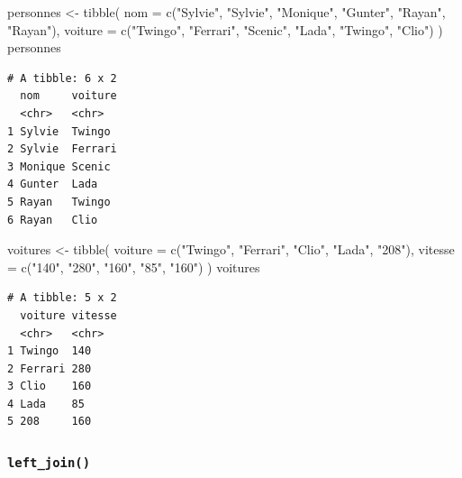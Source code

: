 \documentclass[
  letterpaper,
  DIV=11,
  numbers=noendperiod,
  oneside]{scrreprt}
\newenvironment{Shaded}{\begin{snugshade}}{\end{snugshade}}
\newcommand{\AttributeTok}[1]{\textcolor[rgb]{0.40,0.45,0.13}{#1}}
\newcommand{\FunctionTok}[1]{\textcolor[rgb]{0.28,0.35,0.67}{#1}}
\newcommand{\NormalTok}[1]{\textcolor[rgb]{0.00,0.23,0.31}{#1}}
\newcommand{\OtherTok}[1]{\textcolor[rgb]{0.00,0.23,0.31}{#1}}
\newcommand{\StringTok}[1]{\textcolor[rgb]{0.13,0.47,0.30}{#1}}
\begin{document}
\begin{Shaded}
\begin{Highlighting}[]
\NormalTok{personnes }\OtherTok{\textless{}{-}} \FunctionTok{tibble}\NormalTok{(}
  \AttributeTok{nom =} \FunctionTok{c}\NormalTok{(}\StringTok{"Sylvie"}\NormalTok{, }\StringTok{"Sylvie"}\NormalTok{, }\StringTok{"Monique"}\NormalTok{, }\StringTok{"Gunter"}\NormalTok{, }\StringTok{"Rayan"}\NormalTok{, }\StringTok{"Rayan"}\NormalTok{),}
  \AttributeTok{voiture =} \FunctionTok{c}\NormalTok{(}\StringTok{"Twingo"}\NormalTok{, }\StringTok{"Ferrari"}\NormalTok{, }\StringTok{"Scenic"}\NormalTok{, }\StringTok{"Lada"}\NormalTok{, }\StringTok{"Twingo"}\NormalTok{, }\StringTok{"Clio"}\NormalTok{)}
\NormalTok{)}
\NormalTok{personnes}
\end{Highlighting}
\end{Shaded}

\begin{verbatim}
# A tibble: 6 x 2
  nom     voiture
  <chr>   <chr>  
1 Sylvie  Twingo 
2 Sylvie  Ferrari
3 Monique Scenic 
4 Gunter  Lada   
5 Rayan   Twingo 
6 Rayan   Clio   
\end{verbatim}

\begin{Shaded}
\begin{Highlighting}[]
\NormalTok{voitures }\OtherTok{\textless{}{-}} \FunctionTok{tibble}\NormalTok{(}
  \AttributeTok{voiture =} \FunctionTok{c}\NormalTok{(}\StringTok{"Twingo"}\NormalTok{, }\StringTok{"Ferrari"}\NormalTok{, }\StringTok{"Clio"}\NormalTok{, }\StringTok{"Lada"}\NormalTok{, }\StringTok{"208"}\NormalTok{),}
  \AttributeTok{vitesse =} \FunctionTok{c}\NormalTok{(}\StringTok{"140"}\NormalTok{, }\StringTok{"280"}\NormalTok{, }\StringTok{"160"}\NormalTok{, }\StringTok{"85"}\NormalTok{, }\StringTok{"160"}\NormalTok{)}
\NormalTok{)}
\NormalTok{voitures}
\end{Highlighting}
\end{Shaded}

\begin{verbatim}
# A tibble: 5 x 2
  voiture vitesse
  <chr>   <chr>  
1 Twingo  140    
2 Ferrari 280    
3 Clio    160    
4 Lada    85     
5 208     160    
\end{verbatim}

\hypertarget{left_join}{%
\subsubsection{\texorpdfstring{\texttt{left\_join()}}{left\_join()}}\label{left_join}}
\end{document}
